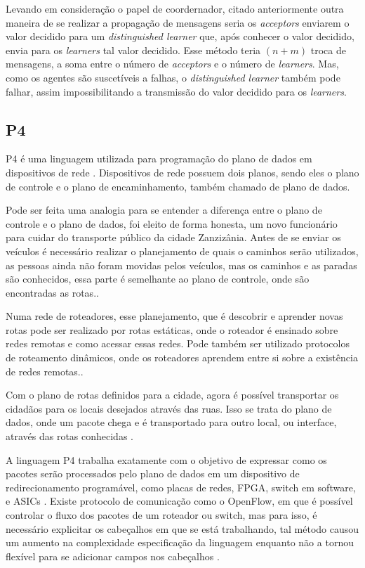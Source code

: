 \documentclass[
    12pt,
    openright, 
    oneside,
    a4paper,
    french,
    english,
    brazil
    ]{facom-ufu-abntex2}
\theoremstyle{definition}
\begin{document}
Levando em consideração o papel de coordernador, citado anteriormente outra maneira de se 
realizar a propagação de mensagens seria os \emph{acceptors} enviarem o valor decidido para um
\emph{distinguished learner} que, após conhecer o valor decidido, envia para os
\emph{learners} tal valor decidido. Esse método teria $(n + m)$ troca de mensagens,
a soma entre o número de \emph{acceptors} e o número de \emph{learners}. Mas, como os
agentes são suscetíveis a falhas, o \emph{distinguished learner} também pode falhar,
assim impossibilitando a transmissão do valor decidido para os \emph{learners}.

\subsection{P4}
P4 é uma linguagem utilizada para programação do plano de dados em  dispositivos de 
rede \cite{paxos16spec}. Dispositivos de rede possuem dois planos, sendo eles o 
plano de controle e o plano de encaminhamento, também chamado de plano de dados. 

Pode ser feita uma analogia para se entender a diferença entre o 
plano de controle e o plano de dados, foi eleito de forma honesta, um novo 
funcionário para cuidar do transporte público da cidade Zanzizânia. Antes de se 
enviar os veículos é necessário realizar o planejamento de quais o caminhos serão
utilizados, as pessoas ainda não foram movidas pelos veículos, mas os caminhos 
e as paradas são conhecidos, essa parte é semelhante ao plano de controle, onde 
são encontradas as rotas.\cite{dataVsControl}.

Numa rede de roteadores, esse planejamento, que é descobrir e aprender novas rotas 
pode ser realizado por rotas estáticas, onde o roteador é ensinado sobre redes remotas
e como acessar essas redes. Pode também ser utilizado protocolos de roteamento dinâmicos,
onde os roteadores aprendem entre si sobre a existência de redes remotas.\cite{dataVsControl}.

Com o plano de rotas definidos para a cidade, agora é possível transportar os cidadãos
para os locais desejados através das ruas. Isso se trata do plano de dados, onde 
um pacote chega e é transportado para outro local, ou interface, através das rotas 
conhecidas \cite{dataVsControl}.

A linguagem P4 trabalha exatamente com o objetivo de expressar como os pacotes serão 
processados pelo plano de dados em um dispositivo de redirecionamento programável, 
como placas de redes, FPGA, switch em software, e ASICs \cite{paxos16spec}. Existe 
protocolo de comunicação como o OpenFlow, em que é possível controlar o fluxo dos 
pacotes de um roteador ou switch, mas para isso, é necessário explicitar os 
cabeçalhos em que se está trabalhando, tal método causou um aumento na complexidade 
especificação da linguagem enquanto não a tornou flexível para se adicionar campos 
nos cabeçalhos \cite{bosshart2014p4}.
\end{document}
